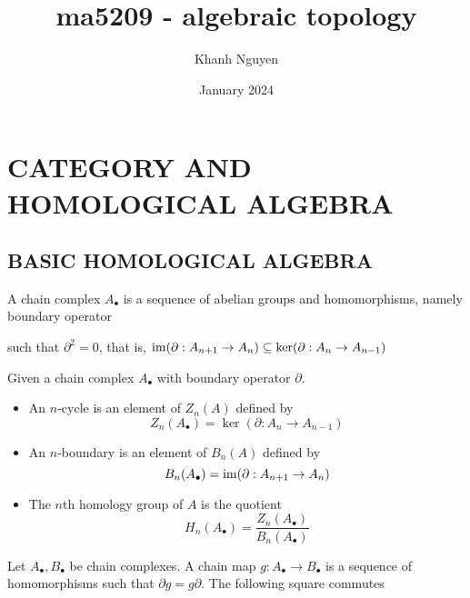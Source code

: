 \documentclass{report}
\title{ma5209 - algebraic topology}
\author{Khanh Nguyen}
\date{January 2024}
\begin{document}
\maketitle
\chapter{CATEGORY AND HOMOLOGICAL ALGEBRA}

\section{BASIC HOMOLOGICAL ALGEBRA}

\begin{definition}
    A chain complex $A_\bullet$ is a sequence of abelian groups and homomorphisms, namely boundary operator
\begin{center}
\end{center}
such that $\partial^2 = 0$, that is, $\operatorname{im} (\partial: A_{n+1} \to A_n) \subseteq \ker(\partial: A_n \to A_{n-1})$

\end{definition}

\begin{definition}
Given a chain complex $A_\bullet$ with boundary operator $\partial$.

\begin{itemize}
    \item An $n$-cycle is an element of $Z_n(A)$ defined by
    $$
        Z_n(A_\bullet) = \ker(\partial: A_n \to A_{n-1})
    $$
    \item An $n$-boundary is an element of $B_n(A)$ defined by
    $$
        B_n(A_\bullet) = \operatorname{im}(\partial: A_{n+1} \to A_n)
    $$
    \item The $n$th homology group of $A$ is the quotient
    $$
        H_n(A_\bullet) = \frac{Z_n(A_\bullet)}{B_n(A_\bullet)}
    $$
\end{itemize}
\end{definition}

\begin{definition}
    Let $A_\bullet, B_\bullet$ be chain complexes. A chain map $g: A_\bullet \to B_\bullet$ is a sequence of homomorphisms such that $\partial g = g \partial$. The following square commutes
\begin{center}
\end{center}

\end{definition}
\end{document}
